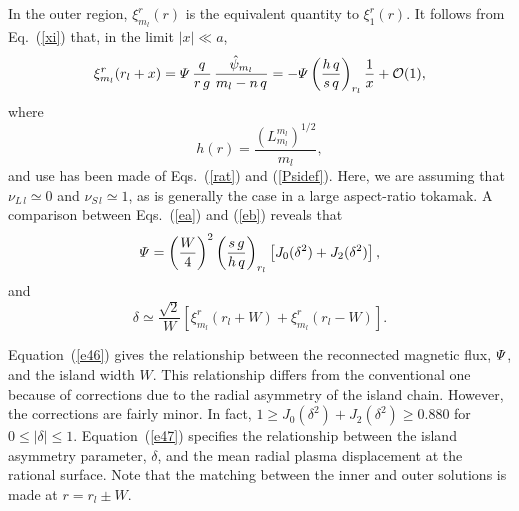 \documentclass[12pt,prb,aps]{revtex4-1}
\begin{document}
In the outer region,  $\xi_{m_{l}}^r(r)$ is the equivalent quantity to $\xi_1^r(r)$.  It follows from Eq.~(\ref{xi}) that, in the limit $|x|\ll a$, 
\begin{equation}\label{eb}
\xi_{m_{l}}^r(r_{l}+x)={\mit\Psi}\,\frac{q}{r\,g}\,\frac{\hat{\psi}_{m_{l}}}{m_{l}-n\,q}
= -{\mit\Psi}\left(\frac{h\,q}{s\,q}\right)_{r_l}\frac{1}{x} + {\cal O}(1),
\end{equation}
where 
\begin{equation}
h(r) = \frac{(L_{m_{l}}^{m_{l}})^{1/2}}{m_{l}},
\end{equation}
and use has been made of Eqs.~(\ref{rat}) and (\ref{Psidef}). Here, we are assuming that $\nu_{L\,l}\simeq 0$ and $\nu_{S\,l}\simeq 1$,
as is generally the case in a large aspect-ratio tokamak. 
A comparison between Eqs.~(\ref{ea}) and (\ref{eb}) reveals that
\begin{equation}\label{e46}
{\mit\Psi} = \left(\frac{W}{4}\right)^2\left(\frac{s\,g}{h\,q}\right)_{r_{l}}\left[J_0(\delta^2)+ J_2(\delta^2)\right],
\end{equation}
and
\begin{equation}\label{e47}
\delta \simeq \frac{\sqrt{2}}{W}\left[\xi_{m_{l}}^r(r_{l}+W)+\xi_{m_{l}}^r(r_{l}-W)\right].
\end{equation}

Equation~(\ref{e46}) gives the relationship between the reconnected magnetic flux, ${\mit\Psi}$, and the island width $W$. This relationship
differs from the conventional one\,\cite{ntm1} because of corrections due to the radial asymmetry of the island chain. However, the corrections are fairly
minor. In fact, $1\geq J_0(\delta^2)+ J_2(\delta^2)\geq 0.880$ for $0\leq |\delta|\leq 1$. Equation~(\ref{e47}) specifies the relationship between the
island asymmetry parameter, $\delta$,  and the mean radial plasma displacement at the rational surface. Note that the matching
between the inner and outer solutions is made at $r=r_{l}\pm W$. 
\end{document}
